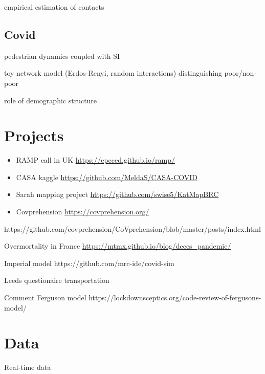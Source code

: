 \documentclass[10pt]{article}
\begin{document}
\cite{mossong2008social} empirical estimation of contacts


\subsection{Covid}

\cite{2020arXiv200409554R} pedestrian dynamics coupled with SI

\cite{2020arXiv200408653S} toy network model (Erdos-Renyi, random interactions) distinguishing poor/non-poor

\cite{Dowd9696} role of demographic structure

\section{Projects}

\begin{itemize}
	\item RAMP call in UK \url{https://epcced.github.io/ramp/}
	\item CASA kaggle \url{https://github.com/MeldaS/CASA-COVID}
	\item Sarah mapping project \url{https://github.com/swise5/KatMapBRC}
	\item Covprehension \url{https://covprehension.org/} 
\end{itemize}









https://github.com/covprehension/CoVprehension/blob/master/posts/index.html

Overmortality in France \url{https://mtmx.github.io/blog/deces_pandemie/}

Imperial model https://github.com/mrc-ide/covid-sim

Leeds questionaire transportation %

Comment Ferguson model https://lockdownsceptics.org/code-review-of-fergusons-model/

\section{Data}

Real-time data
\end{document}
